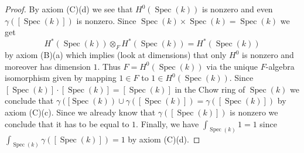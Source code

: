 \documentclass[10pt,a4paper]{amsart}
\theoremstyle{plain}
\theoremstyle{definition}
\theoremstyle{remark}
\numberwithin{equation}{subsection}
\def\Spec{\mathop{\mathrm{Spec}}}
\begin{document}
\begin{proof}
By axiom (C)(d) we see that $H^0(\Spec(k))$ is nonzero and even
$\gamma([\Spec(k)])$ is nonzero.
Since $\Spec(k) \times \Spec(k) = \Spec(k)$ we get
$$
H^*(\Spec(k)) \otimes_F H^*(\Spec(k)) = H^*(\Spec(k))
$$
by axiom (B)(a) which implies (look at dimensions) that only
$H^0$ is nonzero and moreover has dimension $1$. Thus
$F = H^0(\Spec(k))$ via the unique $F$-algebra isomorphism
given by mapping $1 \in F$ to $1 \in H^0(\Spec(k))$.
Since $[\Spec(k)] \cdot [\Spec(k)] = [\Spec(k)]$ in the
Chow ring of $\Spec(k)$ we conclude that
$\gamma([\Spec(k)) \cup \gamma([\Spec(k)]) = \gamma([\Spec(k)])$
by axiom (C)(c). Since we already know that $\gamma([\Spec(k)])$ is nonzero
we conclude that it has to be equal to $1$.
Finally, we have $\int_{\Spec(k)} 1 = 1$ since
$\int_{\Spec(k)} \gamma([\Spec(k)]) = 1$
by axiom (C)(d).
\end{proof}
\end{document}
